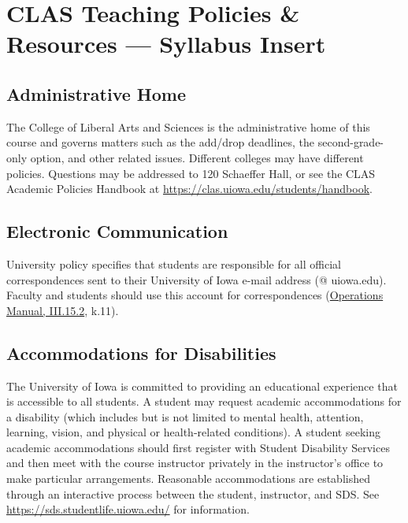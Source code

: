 \documentclass[11pt,]{article}
\theoremstyle{definition}
\theoremstyle{definition}
\theoremstyle{remark}
\begin{document}
\clearpage

\section{CLAS Teaching Policies \& Resources --- Syllabus
Insert}\label{clas-teaching-policies-resources-syllabus-insert}

\subsection{Administrative Home}\label{administrative-home}

The College of Liberal Arts and Sciences is the administrative home of
this course and governs matters such as the add/drop deadlines, the
second-grade-only option, and other related issues. Different colleges
may have different policies. Questions may be addressed to 120 Schaeffer
Hall, or see the CLAS Academic Policies Handbook at
\url{https://clas.uiowa.edu/students/handbook}.

\subsection{Electronic Communication}\label{electronic-communication}

University policy specifies that students are responsible for all
official correspondences sent to their University of Iowa e-mail address
(@ uiowa.edu). Faculty and students should use this account for
correspondences
(\href{https://opsmanual.uiowa.edu/human-resources/professional-ethics-and-academic-responsibility\#15.2}{Operations
Manual, III.15.2}, k.11).

\subsection{Accommodations for
Disabilities}\label{accommodations-for-disabilities}

The University of Iowa is committed to providing an educational
experience that is accessible to all students. A student may request
academic accommodations for a disability (which includes but is not
limited to mental health, attention, learning, vision, and physical or
health-related conditions). A student seeking academic accommodations
should first register with Student Disability Services and then meet
with the course instructor privately in the instructor's office to make
particular arrangements. Reasonable accommodations are established
through an interactive process between the student, instructor, and SDS.
See \url{https://sds.studentlife.uiowa.edu/} for information.
\end{document}
